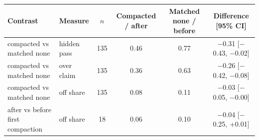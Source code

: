 \begin{tabular}{llcccc}
\toprule
Contrast & Measure & $n$ & Compacted / after & Matched none / before & Difference [95\% CI] \\
\midrule
compacted vs matched none & hidden pass & 135 & 0.46 & 0.77 & $-$0.31 [$-$0.43, $-$0.02] \\
compacted vs matched none & over claim & 135 & 0.36 & 0.63 & $-$0.26 [$-$0.42, $-$0.08] \\
compacted vs matched none & off share & 135 & 0.08 & 0.11 & $-$0.03 [$-$0.05, $-$0.00] \\
after vs before first compaction & off share & 18 & 0.06 & 0.10 & $-$0.04 [$-$0.25, +0.01] \\
\bottomrule
\end{tabular}
